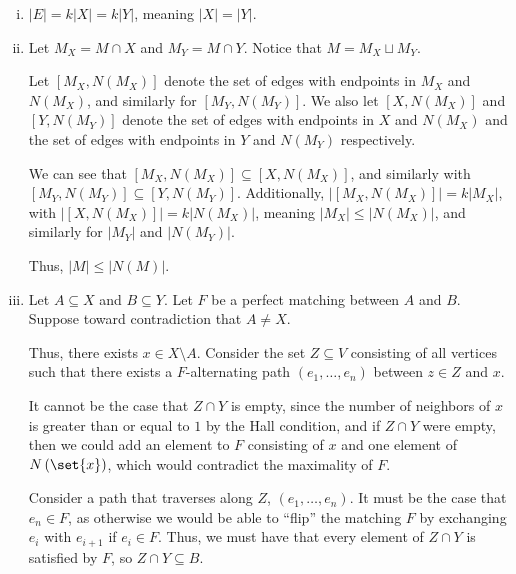 \documentclass[10pt]{mypackage}
\begin{document}
  \begin{solution}\hfill
    \begin{enumerate}[(i)]
      \item $|E| = k|X| = k|Y|$, meaning $|X| = |Y|$.
      \item Let $M_X = M\cap X$ and $M_Y = M\cap Y$. Notice that $M = M_X\sqcup M_Y$.\newline

        Let $\left[M_X,N\left(M_X\right)\right]$ denote the set of edges with endpoints in $M_X$ and $N\left(M_X\right)$, and similarly for $\left[M_Y,N\left(M_Y\right)\right]$. We also let $\left[X,N\left(M_X\right)\right]$ and $\left[Y,N\left(M_Y\right)\right]$ denote the set of edges with endpoints in $X$ and $N\left(M_X\right)$ and the set of edges with endpoints in $Y$ and $N\left(M_Y\right)$ respectively.\newline

        We can see that $\left[M_X,N\left(M_X\right)\right]\subseteq \left[X,N\left(M_X\right)\right]$, and similarly with $\left[M_Y,N\left(M_Y\right)\right]\subseteq \left[Y,N\left(M_Y\right)\right]$. Additionally, $\left\vert \left[M_X,N\left(M_X\right)\right] \right\vert = k\left\vert M_X \right\vert$, with $\left\vert \left[X,N\left(M_X\right)\right] \right\vert = k\left\vert N\left(M_X\right) \right\vert$, meaning $|M_X| \leq |N\left(M_X\right)|$, and similarly for $|M_Y|$ and $|N\left(M_Y\right)|$.\newline

        Thus, $|M| \leq |N(M)|$.
      \item Let $A\subseteq X$ and $B\subseteq Y$. Let $F$ be a perfect matching between $A$ and $B$. Suppose toward contradiction that $A\neq X$.\newline

        Thus, there exists $x\in X\setminus A$. Consider the set $Z\subseteq V$ consisting of all vertices such that there exists a $F$-alternating path $\left(e_1,\dots,e_n\right)$ between $z\in Z$ and $x$.\newline

        It cannot be the case that $Z\cap Y$ is empty, since the number of neighbors of $x$ is greater than or equal to $1$ by the Hall condition, and if $Z\cap Y$ were empty, then we could add an element to $F$ consisting of $x$ and one element of $N\left(\set{x}\right)$, which would contradict the maximality of $F$.\newline

        Consider a path that traverses along $Z$, $\left(e_1,\dots,e_n\right)$. It must be the case that $e_n\in F$, as otherwise we would be able to ``flip'' the matching $F$ by exchanging $e_i$ with $e_{i+1}$ if $e_i\in F$. Thus, we must have that every element of $Z\cap Y$ is satisfied by $F$, so $Z\cap Y\subseteq B$.\newline


\end{enumerate}
\end{solution}
\end{document}
